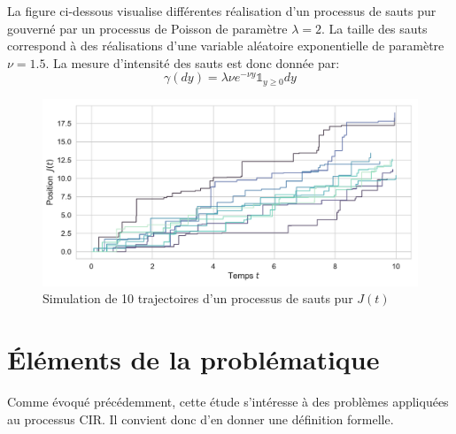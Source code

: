 La figure ci-dessous visualise différentes réalisation d'un processus de sauts pur gouverné par un processus de Poisson de paramètre $\lambda=2$. La taille des sauts correspond à des réalisations d'une variable aléatoire exponentielle de paramètre $\nu=1.5$. La mesure d'intensité des sauts est donc donnée par:
\[
\gamma(dy)=\lambda\nu e^{-\nu y}\mathds{1}_{y\geq0}dy
\]
\begin{figure}[htb]
    \centering
    \includegraphics[width=0.9\linewidth]{img/intro/path_jump.pdf}
    \caption{Simulation de 10 trajectoires d'un processus de sauts pur $J(t)$}\label{fig:TrajJump}
\end{figure}
\FloatBarrier\clearpage

\section{Éléments de la problématique}  %

Comme évoqué précédemment, cette étude s'intéresse à des problèmes appliquées au processus \acl{CIR}. Il convient donc d'en donner une définition formelle.
